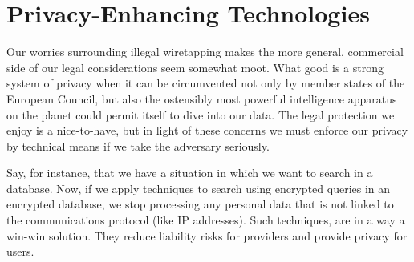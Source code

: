 \documentclass[11pt, a4paper]{article}
\begin{document}



\section{Privacy-Enhancing Technologies}
\label{sec:pet}

Our worries surrounding illegal wiretapping makes the more general, commercial side of our legal considerations seem somewhat moot.
What good is a strong system of privacy when it can be circumvented not only by member states of the European Council, but also the ostensibly most powerful intelligence apparatus on the planet could permit itself to dive into our data.
The legal protection we enjoy is a nice-to-have, but in light of these concerns we must enforce our privacy by technical means if we take the adversary seriously.

Say, for instance, that we have a situation in which we want to search in a database.
Now, if we apply techniques to search using encrypted queries in an encrypted database, we stop processing any personal data that is not linked to the communications protocol (like IP addresses). Such techniques, are in a way a win-win solution. They reduce liability risks for providers and provide privacy for users.
\end{document}
